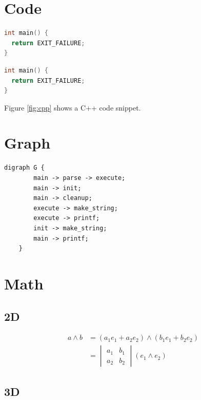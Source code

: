 \documentclass{article}
\begin{document}
\section{Code}

\begin{lstlisting}[language=cpp]
int main() {
  return EXIT_FAILURE;
}
\end{lstlisting}

\begin{lstlisting}[label={fig:cpp}, caption={A C++ snippet.}, language=cpp]
int main() {
  return EXIT_FAILURE;
}
\end{lstlisting}
Figure \ref{fig:cpp} shows a C++ code snippet.


\section{Graph}

\begin{lstlisting}[label={fig:graph}, caption={A dot graph.}, language=dot-image]
	digraph G {
		main -> parse -> execute;
		main -> init;
		main -> cleanup;
		execute -> make_string;
		execute -> printf;
		init -> make_string;
		main -> printf;
	}
\end{lstlisting}

\section{Math}

\subsection{2D}

\begin{equation}\begin{split}
  a \wedge b
  &= \left( a_1 e_1 + a_2 e_2 \right)
  \wedge \left( b_1 e_1 + b_2 e_2 \right) \\
  &= \begin{vmatrix}
  a_1 & b_1 \\
  a_2 & b_2
  \end{vmatrix} \left( e_1 \wedge e_2 \right)
\end{split}\end{equation}

\subsection{3D}
\end{document}
